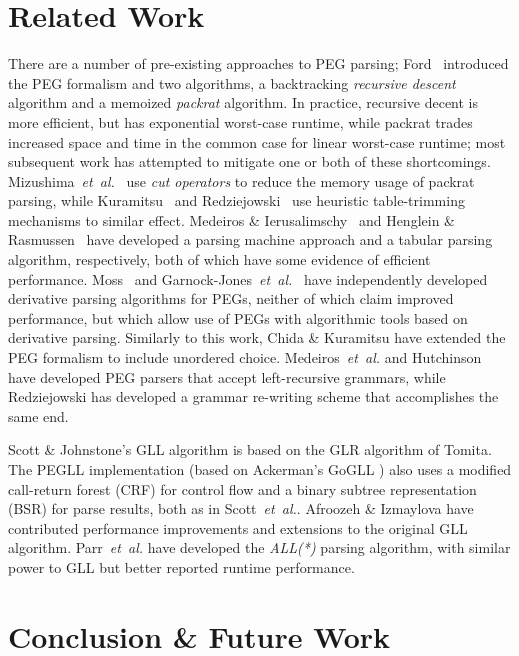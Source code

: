 \documentclass{article}
\makeatletter
\newcommand{\etal}{\textit{et~al.}\@}
\makeatother
\begin{document}
\section{Related Work}
There are a number of pre-existing approaches to PEG parsing; Ford~\cite{For02} introduced the PEG formalism and two algorithms, a backtracking \emph{recursive descent} algorithm and a memoized \emph{packrat} algorithm. 
In practice, recursive decent is more efficient, but has exponential worst-case runtime, while packrat trades increased space and time in the common case for linear worst-case runtime\cite{Mos17}; most subsequent work has attempted to mitigate one or both of these shortcomings. 
Mizushima~\etal~\cite{MMY10} use \emph{cut operators} to reduce the memory usage of packrat parsing, while Kuramitsu~\cite{Kur15} and Redziejowski~\cite{Red07} use heuristic table-trimming mechanisms to similar effect. 
Medeiros \& Ierusalimschy~\cite{MI08} and Henglein \& Rasmussen~\cite{HR17} have developed a parsing machine approach and a tabular parsing algorithm, respectively, both of which have some evidence of efficient performance. 
Moss~\cite{Mos20} and Garnock-Jones~\etal~\cite{GJWE18} have independently developed derivative parsing algorithms for PEGs, neither of which claim improved performance, but which allow use of PEGs with algorithmic tools based on derivative parsing. 
Similarly to this work, Chida \& Kuramitsu \cite{CK17} have extended the PEG formalism to include unordered choice.
Medeiros~\etal \cite{MMI14left} and Hutchinson \cite{Hut20} have developed PEG parsers that accept left-recursive grammars, while Redziejowski \cite{Red21} has developed a grammar re-writing scheme that accomplishes the same end.

Scott \& Johnstone's GLL algorithm \cite{SJ10,SJ16} is based on the GLR algorithm of Tomita\cite{Tom85}. 
The PEGLL implementation (based on Ackerman's GoGLL \cite{Ack19}) also uses a modified call-return forest (CRF) for control flow and a binary subtree representation (BSR) for parse results, both as in Scott~\etal \cite{SJvB19}. 
Afroozeh \& Izmaylova \cite{AI15} have contributed performance improvements and extensions to the original GLL algorithm.
Parr~\etal \cite{PHF14} have developed the \emph{ALL(*)} parsing algorithm, with similar power to GLL but better reported runtime performance.

\section{Conclusion \& Future Work}
\end{document}
